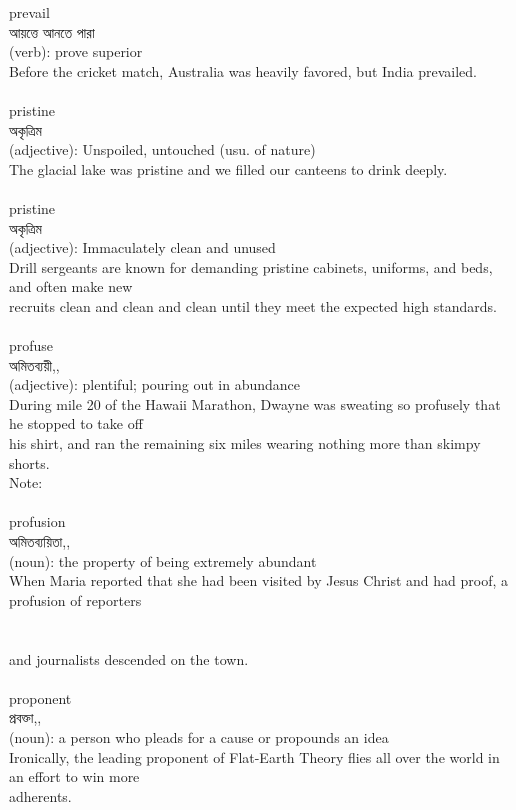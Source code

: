\documentclass{article}
\begin{document}
{prevail}\\
{আয়ত্তে আনতে পারা}\\
{(verb): prove superior\\Before the cricket match, Australia was heavily favored, but India prevailed.\\}\\
{pristine}\\
{অকৃত্রিম}\\
{(adjective): Unspoiled, untouched (usu. of nature)\\The glacial lake was pristine and we filled our canteens to drink deeply.\\}\\
{pristine}\\
{অকৃত্রিম}\\
{(adjective): Immaculately clean and unused\\Drill sergeants are known for demanding pristine cabinets, uniforms, and beds, and often make new\\recruits clean and clean and clean until they meet the expected high standards.\\}\\
{profuse}\\
{অমিতব্যয়ী,,}\\
{(adjective): plentiful; pouring out in abundance\\During mile 20 of the Hawaii Marathon, Dwayne was sweating so profusely that he stopped to take off\\his shirt, and ran the remaining six miles wearing nothing more than skimpy shorts.\\Note:\\}\\
{profusion}\\
{অমিতব্যয়িতা,,}\\
{(noun): the property of being extremely abundant\\When Maria reported that she had been visited by Jesus Christ and had proof, a profusion of reporters\\\\                                                                                 \\and journalists descended on the town.\\}\\
{proponent}\\
{প্রবক্তা,,}\\
{(noun): a person who pleads for a cause or propounds an idea\\Ironically, the leading proponent of Flat-Earth Theory flies all over the world in an effort to win more\\adherents.\\}\\
\end{document}
